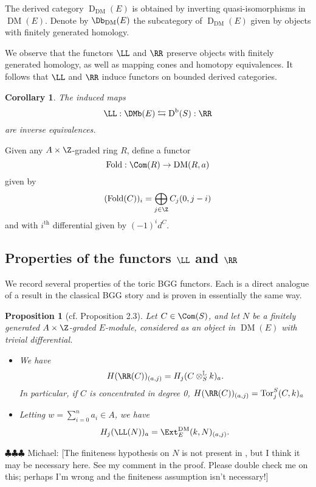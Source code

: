 \documentclass[12pt]{amsart}
\newtheorem{prop}[lemma]{Proposition}
\newtheorem{cor}[lemma]{Corollary}
\theoremstyle{definition}
\theoremstyle{remark}
\newcommand{\Tor}{\operatorname{Tor}}
\newcommand{\michael}[1]{{\color{red} \sf $\clubsuit\clubsuit\clubsuit$ Michael: [#1]}}
\def\on{\operatorname}
\def\DM{\operatorname{DM}}
\def\th{\on{th}}
\begin{document}
The derived category $\on{D}_{\DM}(E)$ is obtained by inverting quasi-isomorphisms in $\DM(E)$. Denote by $\Db_{\DM}(E)$ the subcategory of $\on{D}_{\DM}(E)$ given by objects with finitely generated homology. 






We observe that the functors $\LL$ and $\RR$ preserve objects with finitely generated homology, as well as mapping cones and homotopy equivalences. It follows that $\LL$ and $\RR$ induce functors on bounded derived categories. 




\begin{cor}
The induced maps 
$$
\LL : \DMb(E)  \leftrightarrows \on{D}^{\on{b}}(S) : \RR
$$
are inverse equivalences.
\end{cor}

Given any $A \times \Z$-graded ring $R$, define a functor
$$
\on{Fold} : \Com(R) \to \DM(R, a)
$$
given by
$$
(\on{Fold}(C))_i = \bigoplus_{j \in \Z} C_j(0, j-i)
$$
and with $i^{\th}$ differential given by $(-1)^id^C$. 




\subsection{Properties of the functors $\LL$ and $\RR$}
We record several properties of the toric BGG functors. Each is a direct analogue of a result in the classical BGG story and is proven in essentially the same way.

\begin{prop}[cf. \cite{EFS} Proposition 2.3]
\label{tor} 
Let $C \in \Com(S)$, and let $N$ be a finitely generated $A \times \Z$-graded $E$-module, considered as an object in $\DM(E)$ with trivial differential.
\begin{itemize}
\item[(a)] We have
$$
H(\RR(C))_{(a, j)} = H_{j} (C \otimes^{\mathbb{L}}_S k)_a.
$$
In particular, if $C$ is concentrated in degree 0, $H(\RR(C))_{(a, j)} = \Tor_{j}^S(C, k)_a$

\item[(b)] Letting $w = \sum_{i = 0}^n a_i \in A$, we have
$$
H_j(\LL(N))_a=\Ext^{\DM}_E(k, N)_{(a, j)}.
$$
\end{itemize}
\end{prop}
\michael{The finiteness hypothesis on $N$ is not present in \cite[Proposition 2.3]{EFS}, but I think it may be necessary here. See my comment in the proof. Please double check me on this; perhaps I'm wrong and the finiteness assumption isn't necessary!}
\end{document}

